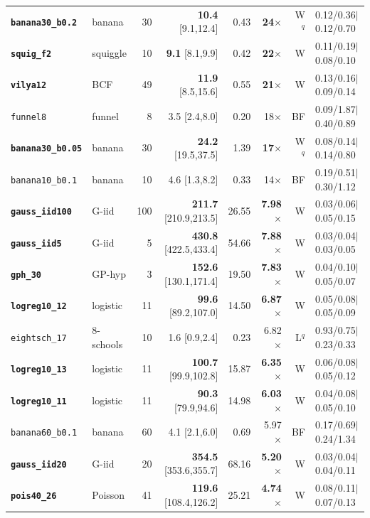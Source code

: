 {\begin{longtable}{llrrrrrl}
\textbf{\texttt{banana30\_b0.2}} & banana & 30 & \textbf{10.4} [9.1,12.4] & 0.43 & \textbf{24$\times$} & W$^q$ & 0.12/0.36$\mid$0.12/0.70\\
\textbf{\texttt{squig\_f2}} & squiggle & 10 & \textbf{9.1} [8.1,9.9] & 0.42 & \textbf{22$\times$} & W & 0.11/0.19$\mid$0.08/0.10\\
\textbf{\texttt{vilya12}} & BCF & 49 & \textbf{11.9} [8.5,15.6] & 0.55 & \textbf{21$\times$} & W & 0.13/0.16$\mid$0.09/0.14\\
\texttt{funnel8} & funnel & 8 & 3.5 [2.4,8.0] & 0.20 & 18$\times$ & BF & 0.09/1.87$\mid$0.40/0.89\\
\textbf{\texttt{banana30\_b0.05}} & banana & 30 & \textbf{24.2} [19.5,37.5] & 1.39 & \textbf{17$\times$} & W$^q$ & 0.08/0.14$\mid$0.14/0.80\\
\texttt{banana10\_b0.1} & banana & 10 & 4.6 [1.3,8.2] & 0.33 & 14$\times$ & BF & 0.19/0.51$\mid$0.30/1.12\\
\textbf{\texttt{gauss\_iid100}} & G-iid & 100 & \textbf{211.7} [210.9,213.5] & 26.55 & \textbf{7.98$\times$} & W & 0.03/0.06$\mid$0.05/0.15\\
\textbf{\texttt{gauss\_iid5}} & G-iid & 5 & \textbf{430.8} [422.5,433.4] & 54.66 & \textbf{7.88$\times$} & W & 0.03/0.04$\mid$0.03/0.05\\
\textbf{\texttt{gph\_30}} & GP-hyp & 3 & \textbf{152.6} [130.1,171.4] & 19.50 & \textbf{7.83$\times$} & W & 0.04/0.10$\mid$0.05/0.07\\
\textbf{\texttt{logreg10\_12}} & logistic & 11 & \textbf{99.6} [89.2,107.0] & 14.50 & \textbf{6.87$\times$} & W & 0.05/0.08$\mid$0.05/0.09\\
\texttt{eightsch\_17} & 8-schools & 10 & 1.6 [0.9,2.4] & 0.23 & 6.82$\times$ & L$^q$ & 0.93/0.75$\mid$0.23/0.33\\
\textbf{\texttt{logreg10\_13}} & logistic & 11 & \textbf{100.7} [99.9,102.8] & 15.87 & \textbf{6.35$\times$} & W & 0.06/0.08$\mid$0.05/0.12\\
\textbf{\texttt{logreg10\_11}} & logistic & 11 & \textbf{90.3} [79.9,94.6] & 14.98 & \textbf{6.03$\times$} & W & 0.04/0.08$\mid$0.05/0.10\\
\texttt{banana60\_b0.1} & banana & 60 & 4.1 [2.1,6.0] & 0.69 & 5.97$\times$ & BF & 0.17/0.69$\mid$0.24/1.34\\
\textbf{\texttt{gauss\_iid20}} & G-iid & 20 & \textbf{354.5} [353.6,355.7] & 68.16 & \textbf{5.20$\times$} & W & 0.03/0.04$\mid$0.04/0.11\\
\textbf{\texttt{pois40\_26}} & Poisson & 41 & \textbf{119.6} [108.4,126.2] & 25.21 & \textbf{4.74$\times$} & W & 0.08/0.11$\mid$0.07/0.13\\

\end{longtable}}
